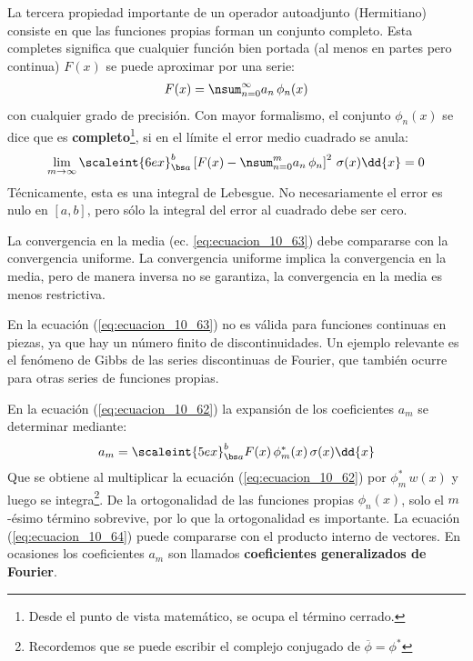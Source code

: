 La tercera propiedad importante de un operador autoadjunto (Hermitiano) consiste en que las funciones propias forman un conjunto completo. Esta completes significa que cualquier función bien portada (al menos en partes pero continua) $F(x)$ se puede aproximar por una serie:
\begin{align}
F(x) = \nsum_{n=0}^{\infty} a_{n} \, \phi_{n}(x) 
\label{eq:ecuacion_10_62}
\end{align}
con cualquier grado de precisión. Con mayor formalismo, el conjunto $\phi_{n} (x)$ se dice que es \textbf{completo}\footnote{Desde el punto de vista matemático, se ocupa el término cerrado.}, si en el límite el error medio cuadrado se anula:
\begin{align}
\lim_{m \to \infty} \scaleint{6ex}_{\bs a}^{b} \left[ F(x) - \nsum_{n=0}^{m} a_{n} \, \phi_{n} \right]^{2} \, \sigma (x) \dd{x} = 0
\label{eq:ecuacion_10_63}
\end{align}
Técnicamente, esta es una integral de Lebesgue. No necesariamente el error es nulo en $[a,b]$, pero sólo la integral del error al cuadrado debe ser cero.
\par
La convergencia en la media (ec. \ref{eq:ecuacion_10_63}) debe compararse con la convergencia uniforme. La convergencia uniforme implica la convergencia en la media, pero de manera inversa no se garantiza, la convergencia en la media es menos restrictiva.
\par
En la ecuación (\ref{eq:ecuacion_10_63}) no es válida para funciones continuas en piezas, ya que hay un número finito de discontinuidades. Un ejemplo relevante es el fenómeno de Gibbs de las series discontinuas de Fourier, que también ocurre para otras series de funciones propias.
\par
 En la ecuación (\ref{eq:ecuacion_10_62}) la expansión de los coeficientes $a_{m}$ se determinar mediante:
\begin{align}
a_{m} = \scaleint{5ex}_{\bs a}^{b} F(x) \, \phi_{m}^{*} (x) \, \sigma (x) \dd{x}
\label{eq:ecuacion_10_64}
\end{align}
Que se obtiene al multiplicar la ecuación (\ref{eq:ecuacion_10_62}) por $\phi_{m}^{*} \, w(x)$ y luego se integra\footnote{Recordemos que se puede escribir el complejo conjugado de $\overline{\phi} = \phi^{*}$}. De la ortogonalidad de las funciones propias $\phi_{n}(x)$, solo el $m$-ésimo término sobrevive, por lo que la ortogonalidad es importante. La ecuación (\ref{eq:ecuacion_10_64}) puede compararse con el producto interno de vectores. En ocasiones los coeficientes $a_{m}$ son llamados \textbf{coeficientes generalizados de Fourier}.
